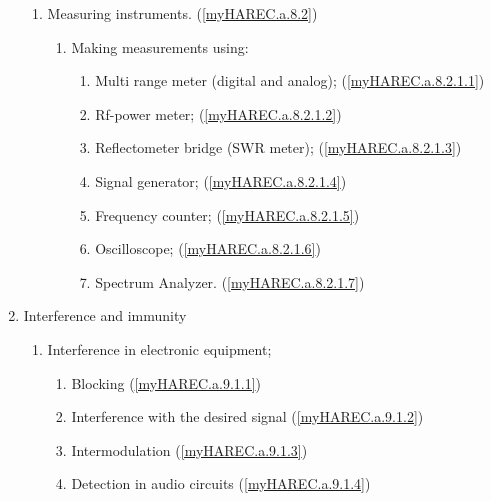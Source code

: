 \begin{enumerate}
\begin{enumerate}
\item Measuring instruments. (\ref{myHAREC.a.8.2})\label{HAREC.a.8.2}
\begin{enumerate}
\item Making measurements using:
\begin{enumerate}
\item Multi range meter (digital and analog);
  (\ref{myHAREC.a.8.2.1.1})\label{HAREC.a.8.2.1.1}
\item Rf-power meter; (\ref{myHAREC.a.8.2.1.2})\label{HAREC.a.8.2.1.2}
\item Reflectometer bridge (SWR meter);
  (\ref{myHAREC.a.8.2.1.3})\label{HAREC.a.8.2.1.3}
\item Signal generator; (\ref{myHAREC.a.8.2.1.4})\label{HAREC.a.8.2.1.4}
\item Frequency counter; (\ref{myHAREC.a.8.2.1.5})\label{HAREC.a.8.2.1.5}
\item Oscilloscope; (\ref{myHAREC.a.8.2.1.6})\label{HAREC.a.8.2.1.6}
\item Spectrum Analyzer. (\ref{myHAREC.a.8.2.1.7})\label{HAREC.a.8.2.1.7}
\end{enumerate}
\end{enumerate}
\end{enumerate}

\item Interference and immunity
\begin{enumerate}

\item Interference in electronic equipment;
\begin{enumerate}
\item Blocking (\ref{myHAREC.a.9.1.1})\label{HAREC.a.9.1.1}
\item Interference with the desired signal
  (\ref{myHAREC.a.9.1.2})\label{HAREC.a.9.1.2}
\item Intermodulation (\ref{myHAREC.a.9.1.3})\label{HAREC.a.9.1.3}
\item Detection in audio circuits (\ref{myHAREC.a.9.1.4})\label{HAREC.a.9.1.4}
\end{enumerate}


\end{enumerate}
\end{enumerate}

